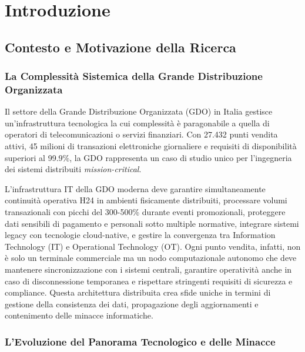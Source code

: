 \chapter{Introduzione}
\label{cap1_introduction}

\section{Contesto e Motivazione della Ricerca}

\subsection{La Complessità Sistemica della Grande Distribuzione Organizzata}

Il settore della Grande Distribuzione Organizzata (GDO) in Italia gestisce un'infrastruttura tecnologica la cui complessità è paragonabile a quella di operatori di telecomunicazioni o servizi finanziari. Con 27.432 punti vendita attivi\autocite{istat2024}, 45 milioni di transazioni elettroniche giornaliere e requisiti di disponibilità superiori al 99.9\%, la GDO rappresenta un caso di studio unico per l'ingegneria dei sistemi distribuiti \textit{mission-critical}.

L'infrastruttura IT della GDO moderna deve garantire simultaneamente continuità operativa H24 in ambienti fisicamente distribuiti, processare volumi transazionali con picchi del 300-500\% durante eventi promozionali\autocite{Osservatorio2024}, proteggere dati sensibili di pagamento e personali sotto multiple normative, integrare sistemi legacy con tecnologie cloud-native, e gestire la convergenza tra Information Technology (IT) e Operational Technology (OT). Ogni punto vendita, infatti, non è solo un terminale commerciale ma un nodo computazionale autonomo che deve mantenere sincronizzazione con i sistemi centrali, garantire operatività anche in caso di disconnessione temporanea e rispettare stringenti requisiti di sicurezza e compliance. Questa architettura distribuita crea sfide uniche in termini di gestione della consistenza dei dati, propagazione degli aggiornamenti e contenimento delle minacce informatiche.

\subsection{L'Evoluzione del Panorama Tecnologico e delle Minacce}

